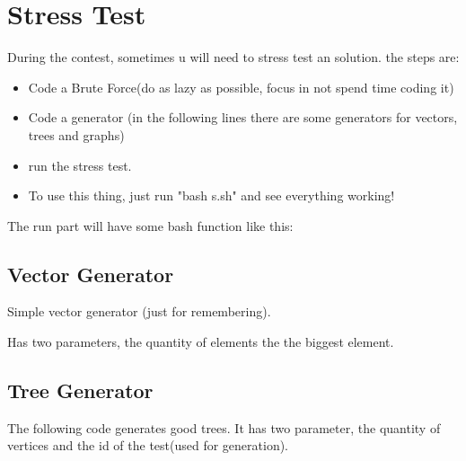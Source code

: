     \section{Stress Test}
    During the contest, sometimes u will need to stress test an solution.
    the steps are:
    \begin{itemize}
        \item Code a Brute Force(do as lazy as possible, focus in not spend time coding it)
        \item Code a generator (in the following lines there are some generators for vectors, trees and graphs)
        \item run the stress test.
        \item To use this thing, just run "bash s.sh" and see everything working!
    \end{itemize}

    The run part will have some bash function like this:
    
    

    \subsection{Vector Generator}

    Simple vector generator (just for remembering).

    Has two parameters, the quantity of elements the the biggest element.
    
    
    
    \subsection{Tree Generator}
    The following code generates good trees.
    It has two parameter, the quantity of vertices and the id of the test(used for generation).

    

    